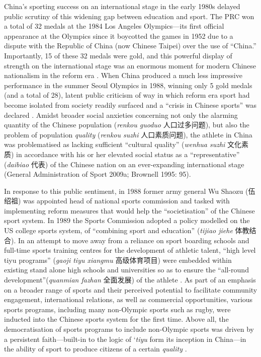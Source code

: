 \begin{CJK}{UTF8}{gbsn}
China's sporting success on an international stage in the early 1980s delayed public scrutiny of this widening gap between education and sport. The PRC won a total of 32 medals at the 1984 Los Angeles Olympics---its first official appearance at the Olympics since it boycotted the games in 1952 due to a dispute with the Republic of China (now Chinese Taipei) over the use of ``China.''  Importantly, 15 of these 32 medals were gold, and this powerful display of strength on the international stage was an enormous moment for modern Chinese nationalism in the reform era \citep{Brownell2008}.  When China produced a much less impressive performance in the summer Seoul Olympics in 1988, winning only 5 gold medals (and a total of 28), latent public criticism of way in which reform era sport had become isolated from society readily surfaced and a ``crisis in Chinese sports'' was declared \citep[199]{Brownell1995}.  Amidst broader social anxieties concerning not only the alarming quantity of the Chinese population (\textit{renkou guoduo} 人口过多问题), but also the problem of population \textit{quality} (\textit{renkou suzhi} 人口素质问题), the athlete in China was problematised as lacking sufficient ``cultural quality'' (\textit{wenhua suzhi} 文化素质) in accordance with his or her elevated social status as a ``representative'' (\textit{daibiao} 代表) of the Chinese nation on an ever-expanding international stage (General Administration of Sport 2009a; Brownell 1995: 95).

In response to this public sentiment, in 1988 former army general Wu Shaozu (伍绍祖) was appointed head of national sports commission and tasked with implementing reform measures that would help the ``societisation'' of the Chinese sport system.  In 1989 the Sports Commission adopted a policy modelled on the US college sports system, of ``combining sport and education'' (\textit{tijiao jiehe} 体教结合).  In an attempt to move away from a reliance on sport boarding schools and full-time sports training centres for the development of athletic talent, ``high level tiyu programs'' (\textit{gaoji tiyu xiangmu} 高级体育项目) were embedded within existing stand alone high schools and universities so as to ensure the ``all-round development''(\textit{quanmian fazhan} 全面发展) of the athlete \citep[203]{Brownell1995}.  As part of an emphasis on a broader range of sports and their perceived potential to facilitate community engagement, international relations, as well as commercial opportunities, various sports programs, including many non-Olympic sports such as rugby, were inducted into the Chinese sports system for the first time\citep[70]{Knuttgen1990}.  Above all, the  democratisation of sports programs to include non-Olympic sports was driven by a persistent faith---built-in to the logic of `\textit{tiyu} form its inception in China---in the ability of sport to produce citizens of a certain \textit{quality} \citep[7]{Woronov2003}.


\end{CJK}
